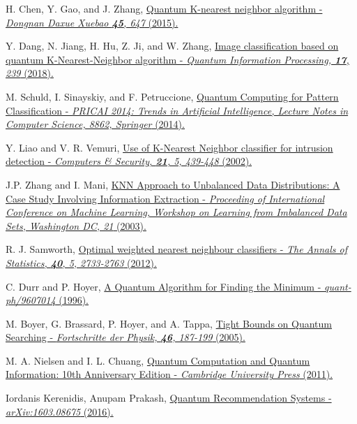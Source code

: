 \documentclass[a4paper,twocolumn,11pt,unpublished]{quantumarticle}
\begin{document}
\begin{thebibliography}{39}
 H. Chen, Y. Gao, and J. Zhang,
  \href{https://doi.org/10.3969/j.issn.1001-0505.2015.04.006}{Quantum K-nearest neighbor algorithm - \textit{Dongnan Daxue Xuebao \textbf{45}, 647} (2015).}

 Y. Dang, N. Jiang, H. Hu, Z. Ji, and W. Zhang,
  \href{https://doi.org/10.1007/s11128-018-2004-9}{Image classification based on quantum K-Nearest-Neighbor algorithm - \textit{Quantum Information Processing, \textbf{17}, 239} (2018).}
  
 M. Schuld, I. Sinayskiy, and F. Petruccione,
  \href{https://doi.org/10.1007/978-3-319-13560-1_17}{Quantum Computing for Pattern Classification - \textit{PRICAI 2014: Trends in Artificial Intelligence, Lecture Notes in Computer Science, 8862, Springer} (2014).}

 Y. Liao and V. R. Vemuri,
  \href{https://doi.org/10.1016/S0167-4048(02)00514-X}{Use of K-Nearest Neighbor classifier for intrusion detection - \textit{Computers \& Security, \textbf{21}, 5, 439-448} (2002).}
  
 J.P. Zhang and I. Mani,
  \href{https://www.bibsonomy.org/bibtex/2cf4d2ac8bdac874b3d4841b4645a5a90/diana}{KNN Approach to Unbalanced Data Distributions: A Case Study Involving Information Extraction - \textit{Proceeding of International Conference on Machine Learning, Workshop on Learning from Imbalanced Data Sets, Washington DC, 21} (2003).}
  
  R. J. Samworth,
  \href{http://dx.doi.org/10.1214/12-AOS1049}{Optimal weighted nearest neighbour classifiers - \textit{The Annals of Statistics, \textbf{40}, 5, 2733-2763} (2012).}
  
   C. Durr and P. Hoyer,
  \href{https://arxiv.org/abs/quant-ph/9607014v2}{A Quantum Algorithm for Finding the Minimum - \textit{quant-ph/9607014} (1996).}

  M. Boyer, G. Brassard, P. Hoyer, and A. Tappa,
  \href{https://doi.org/10.1002/3527603093.ch10}{Tight Bounds on Quantum Searching - \textit{Fortschritte der Physik, \textbf{46}, 187-199} (2005).}
  
  M. A. Nielsen and I. L. Chuang,
  \href{https://doi.org/10.1017/CBO9780511976667}{Quantum Computation and Quantum Information: 10th Anniversary Edition - \textit{Cambridge University Press} (2011).}
  
  Iordanis Kerenidis, Anupam Prakash,
  \href{https://arxiv.org/abs/1603.08675}{Quantum Recommendation Systems - \textit{arXiv:1603.08675} (2016).}
  

\end{thebibliography}
\end{document}
